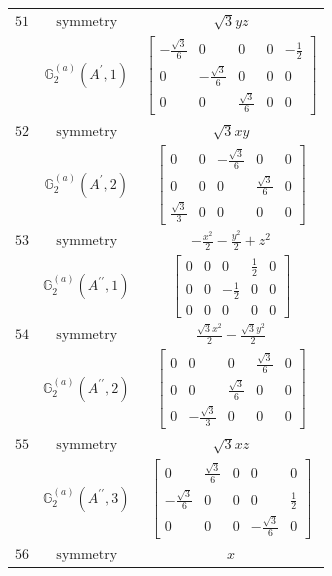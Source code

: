 \documentclass[fleqn,8pt,landscape]{jsarticle}
\begin{document}
\begin{longtable}{ccc}
$ 51 $ & $ \text{symmetry} $ & $ \sqrt{3} y z $ \\
$  $ & $ \mathbb{G}_{2}^{(a)}(A^{\prime},1) $ & $ \begin{bmatrix} - \frac{\sqrt{3}}{6} & 0 & 0 & 0 & - \frac{1}{2} \\ 0 & - \frac{\sqrt{3}}{6} & 0 & 0 & 0 \\ 0 & 0 & \frac{\sqrt{3}}{6} & 0 & 0 \end{bmatrix} $ \\ \hline
$ 52 $ & $ \text{symmetry} $ & $ \sqrt{3} x y $ \\
$  $ & $ \mathbb{G}_{2}^{(a)}(A^{\prime},2) $ & $ \begin{bmatrix} 0 & 0 & - \frac{\sqrt{3}}{6} & 0 & 0 \\ 0 & 0 & 0 & \frac{\sqrt{3}}{6} & 0 \\ \frac{\sqrt{3}}{3} & 0 & 0 & 0 & 0 \end{bmatrix} $ \\ \hline
$ 53 $ & $ \text{symmetry} $ & $ - \frac{x^{2}}{2} - \frac{y^{2}}{2} + z^{2} $ \\
$  $ & $ \mathbb{G}_{2}^{(a)}(A^{\prime\prime},1) $ & $ \begin{bmatrix} 0 & 0 & 0 & \frac{1}{2} & 0 \\ 0 & 0 & - \frac{1}{2} & 0 & 0 \\ 0 & 0 & 0 & 0 & 0 \end{bmatrix} $ \\ \hline
$ 54 $ & $ \text{symmetry} $ & $ \frac{\sqrt{3} x^{2}}{2} - \frac{\sqrt{3} y^{2}}{2} $ \\
$  $ & $ \mathbb{G}_{2}^{(a)}(A^{\prime\prime},2) $ & $ \begin{bmatrix} 0 & 0 & 0 & \frac{\sqrt{3}}{6} & 0 \\ 0 & 0 & \frac{\sqrt{3}}{6} & 0 & 0 \\ 0 & - \frac{\sqrt{3}}{3} & 0 & 0 & 0 \end{bmatrix} $ \\ \hline
$ 55 $ & $ \text{symmetry} $ & $ \sqrt{3} x z $ \\
$  $ & $ \mathbb{G}_{2}^{(a)}(A^{\prime\prime},3) $ & $ \begin{bmatrix} 0 & \frac{\sqrt{3}}{6} & 0 & 0 & 0 \\ - \frac{\sqrt{3}}{6} & 0 & 0 & 0 & \frac{1}{2} \\ 0 & 0 & 0 & - \frac{\sqrt{3}}{6} & 0 \end{bmatrix} $ \\ \hline
$ 56 $ & $ \text{symmetry} $ & $ x $ \\

\end{longtable}
\end{document}
